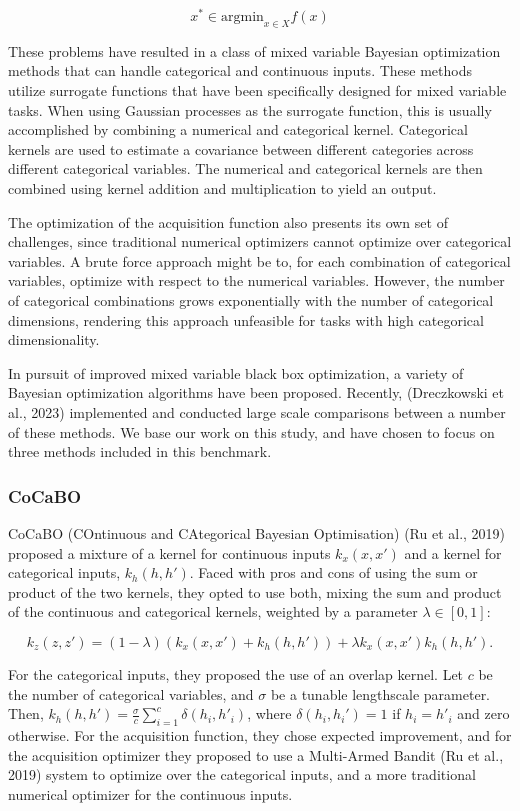 \documentclass[12pt,twoside]{reedthesis}
\begin{document}
\[x^*\in\text{argmin}_{x\in X}f(x)\]

These problems have resulted in a class of mixed variable Bayesian optimization methods that can handle categorical and continuous inputs. These methods utilize surrogate functions that have been specifically designed for mixed variable tasks. When using Gaussian processes as the surrogate function, this is usually accomplished by combining a numerical and categorical kernel. Categorical kernels are used to estimate a covariance between different categories across different categorical variables. The numerical and categorical kernels are then combined using kernel addition and multiplication to yield an output.

The optimization of the acquisition function also presents its own set of challenges, since traditional numerical optimizers cannot optimize over categorical variables. A brute force approach might be to, for each combination of categorical variables, optimize with respect to the numerical variables. However, the number of categorical combinations grows exponentially with the number of categorical dimensions, rendering this approach unfeasible for tasks with high categorical dimensionality.

In pursuit of improved mixed variable black box optimization, a variety of Bayesian optimization algorithms have been proposed. Recently, (Dreczkowski et al., 2023) implemented and conducted large scale comparisons between a number of these methods. We base our work on this study, and have chosen to focus on three methods included in this benchmark.

\hypertarget{cocabo}{%
\subsubsection{CoCaBO}\label{cocabo}}

CoCaBO (COntinuous and CAtegorical Bayesian Optimisation) (Ru et al., 2019) proposed a mixture of a kernel for continuous inputs \(k_x(x,x')\) and a kernel for categorical inputs, \(k_h(h,h')\). Faced with pros and cons of using the sum or product of the two kernels, they opted to use both, mixing the sum and product of the continuous and categorical kernels, weighted by a parameter \(\lambda\in[0, 1]\):

\[k_z(z,z')=(1-\lambda)(k_x(x,x')+k_h(h,h'))+\lambda k_x(x,x')k_h(h,h').\]

For the categorical inputs, they proposed the use of an overlap kernel. Let \(c\) be the number of categorical variables, and \(\sigma\) be a tunable lengthscale parameter. Then, \(k_h(h,h')=\frac{\sigma}{c}\sum_{i=1}^c\delta(h_i,h'_i)\), where \(\delta(h_i,h_i')=1\) if \(h_i=h'_i\) and zero otherwise. For the acquisition function, they chose expected improvement, and for the acquisition optimizer they proposed to use a Multi-Armed Bandit (Ru et al., 2019) system to optimize over the categorical inputs, and a more traditional numerical optimizer for the continuous inputs.
\end{document}
